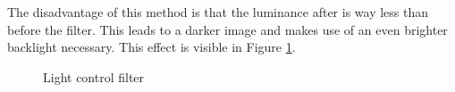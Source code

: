 The disadvantage of this method is that the luminance after is way less than before the filter.
This leads to a darker image and makes use of an even brighter backlight necessary.
This effect is visible in Figure \ref{theory:filtercompare}.
\begin{figure}[ht]
	\centering
	\caption{Light control filter \label{theory:filtercompare}}	
\end{figure}

